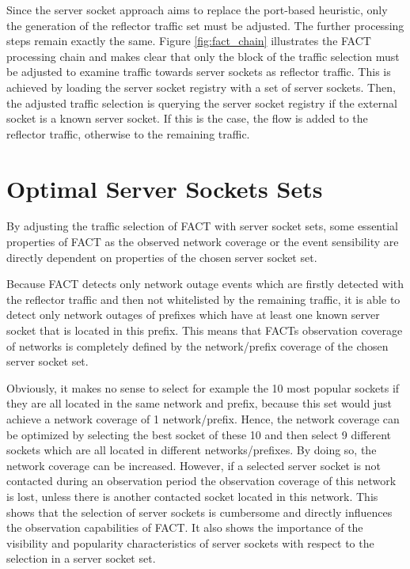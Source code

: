 Since the server socket approach aims to replace the port-based heuristic, only the generation of the reflector traffic set must be adjusted. The further processing steps remain exactly the same. Figure \ref{fig:fact_chain} illustrates the FACT processing chain and makes clear that only the block of the traffic selection must be adjusted to examine traffic towards server sockets as reflector traffic. This is achieved by loading the server socket registry with a set of server sockets. Then, the adjusted traffic selection is querying the server socket registry if the external socket is a known server socket. If this is the case, the flow is added to the reflector traffic, otherwise to the remaining traffic. 

\section{Optimal Server Sockets Sets\label{section:ses_selection}}
By adjusting the traffic selection of FACT with server socket sets, some 
essential properties of FACT as the observed network coverage or the event 
sensibility are directly dependent on properties of the chosen server socket 
set. 

Because FACT detects only network outage events which are firstly detected with 
the reflector traffic and then not whitelisted by the remaining traffic, it is 
able to detect only network outages of prefixes which have at least one known 
server socket that is located in this prefix. This means that FACTs observation 
coverage of networks is completely defined by the network/prefix coverage of the 
chosen server socket set. 

Obviously, it makes no sense to select for example the 10 most popular sockets 
if they are all located in the same network and prefix, because this set would 
just achieve a network coverage of 1 network/prefix. Hence, the network coverage 
can be optimized by selecting the best socket of these 10 and then select 9 
different sockets which are all located in different networks/prefixes. By doing 
so, the network coverage can be increased. However, if a selected server socket 
is not contacted during an observation period the observation coverage of this 
network is lost, unless there is another contacted socket located in this 
network. This shows that the selection of server sockets is cumbersome and 
directly influences the observation capabilities of FACT. It also shows the 
importance of the visibility and popularity characteristics of server sockets 
with respect to the selection in a server socket set. 

